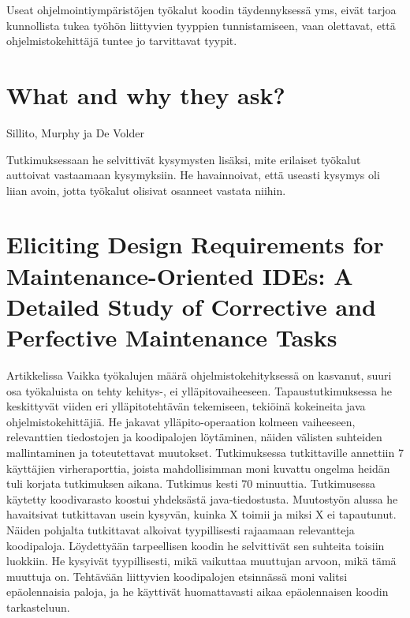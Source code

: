 \documentclass[finnish]{../tktltiki2}
\theoremstyle{definition}
\theoremstyle{remark}
\begin{document}
Useat ohjelmointiympäristöjen työkalut koodin täydennyksessä yms, eivät tarjoa kunnollista tukea työhön liittyvien tyyppien tunnistamiseen, vaan olettavat, että ohjelmistokehittäjä tuntee jo tarvittavat tyypit.  \cite{asking-and-answering-api-questions}

\section{What and why they ask?}

Sillito, Murphy ja De Volder \cite{questions-during-software-evolution-tasks}

Tutkimuksessaan he selvittivät kysymysten lisäksi, mite erilaiset työkalut auttoivat vastaamaan kysymyksiin. He havainnoivat, että useasti kysymys oli liian avoin, jotta työkalut olisivat osanneet vastata niihin.

\section{Eliciting Design Requirements for Maintenance-Oriented IDEs: A Detailed Study of Corrective and Perfective Maintenance Tasks}
Artikkelissa \cite{eliciting-design-requirements-for-maintenance-oriented-ides}
Vaikka työkalujen määrä ohjelmistokehityksessä on kasvanut, suuri osa työkaluista on tehty kehitys-, ei ylläpitovaiheeseen. Tapaustutkimuksessa he keskittyvät viiden eri ylläpitotehtävän tekemiseen, tekiöinä kokeineita java ohjelmistokehittäjiä.
He jakavat ylläpito-operaation kolmeen vaiheeseen, relevanttien tiedostojen ja koodipalojen löytäminen, näiden välisten suhteiden mallintaminen ja toteutettavat muutokset.
Tutkimuksessa tutkittaville annettiin 7 käyttäjien virheraporttia, joista mahdollisimman moni kuvattu ongelma heidän tuli korjata tutkimuksen aikana. Tutkimus kesti 70 minuuttia.
Tutkimusessa käytetty koodivarasto koostui yhdeksästä java-tiedostusta.
Muutostyön alussa he havaitsivat tutkittavan usein kysyvän, kuinka X toimii ja miksi X ei tapautunut. Näiden pohjalta tutkittavat alkoivat tyypillisesti rajaamaan relevantteja koodipaloja.
Löydettyään tarpeellisen koodin he selvittivät sen suhteita toisiin luokkiin. He kysyivät tyypillisesti, mikä vaikuttaa muuttujan arvoon, mikä tämä muuttuja on.
Tehtävään liittyvien koodipalojen etsinnässä moni valitsi epäolennaisia paloja, ja he käyttivät huomattavasti aikaa epäolennaisen koodin tarkasteluun.
\end{document}

